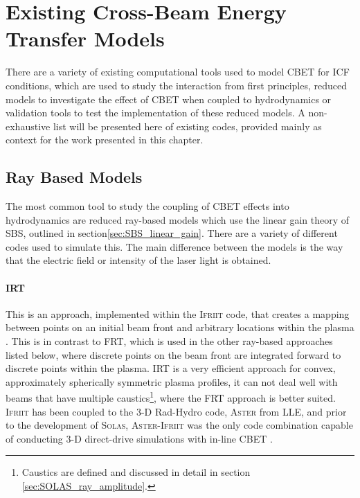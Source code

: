 \section{Existing Cross-Beam Energy Transfer Models}

There are a variety of existing computational tools used to model \ac{CBET} for \ac{ICF} conditions, which are used to study the interaction from first principles, reduced models to investigate the effect of \ac{CBET} when coupled to hydrodynamics or validation tools to test the implementation of these reduced models.
A non-exhaustive list will be presented here of existing codes, provided mainly as context for the work presented in this chapter.

\subsection{Ray Based Models}

The most common tool to study the coupling of \ac{CBET} effects into hydrodynamics are reduced ray-based models which use the linear gain theory of \ac{SBS}, outlined in section\ref{sec:SBS_linear_gain}.
There are a variety of different codes used to simulate this.
The main difference between the models is the way that the electric field or intensity of the laser light is obtained.

\paragraph*{\ac{IRT}} This is an approach, implemented within the \textsc{Ifriit} code, that creates a mapping between points on an initial beam front and arbitrary locations within the plasma \cite{colaitis_real_2019,colaitis_adaptive_2019}.
This is in contrast to \ac{FRT}, which is used in the other ray-based approaches listed below, where discrete points on the beam front are integrated forward to discrete points within the plasma.
\ac{IRT} is a very efficient approach for convex, approximately spherically symmetric plasma profiles, it can not deal well with beams that have multiple caustics\footnote{Caustics are defined and discussed in detail in section \ref{sec:SOLAS_ray_amplitude}.}, where the \ac{FRT} approach is better suited.
\textsc{Ifriit} has been coupled to the 3-D \ac{Rad-Hydro} code, \textsc{Aster} from \ac{LLE}, and prior to the development of \textsc{Solas}, \textsc{Aster}-\textsc{Ifriit} was the only code combination capable of conducting 3-D direct-drive simulations with in-line \ac{CBET} \cite{colaitis_inverse_2021}.

